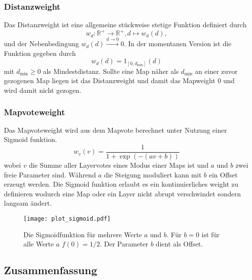    \subsubsection{Distanzweight}
        Das Distanzweight ist eine allgemeine stückweise stetige Funktion definiert durch
        \begin{equation}
            w_d : \mathbb{R}^+ \rightarrow \mathbb{R}^+, d \mapsto w_d(d),
        \end{equation}
        und der Nebenbedingung $w_d(d)\overset{d\rightarrow 0}{\longrightarrow}0$.
        In der momentanen Version ist die Funktion gegeben durch
        \begin{equation}
            w_d(d) = 1_{[0,d_\text{min}]}(d)
        \end{equation}
        mit $d_\text{min}\geq 0$ als Mindestdistanz. 
        Sollte eine Map näher als $d_\text{min}$ an einer zuvor gezogenen Map liegen ist das Distanzweight und damit das Mapweight $0$ und wird damit nicht gezogen. 
    \subsubsection{Mapvoteweight}
        Das Mapvoteweight wird aus dem Mapvote berechnet unter Nutzung einer Sigmoid funktion. 
        \begin{equation}
            w_v(v) = \frac{1}{1+\exp\left(-(av+b)\right)}
        \end{equation}
        wobei $v$ die Summe aller Layervotes eines Modus einer Maps ist und $a$ und $b$ zwei freie Parameter sind.
        Während $a$ die Steigung moduliert kann mit $b$ ein Offset erzeugt werden.
        Die Sigmoid funktion erlaubt es ein kontinuierliches weight zu definieren wodurch eine Map oder ein Layer nicht abrupt verschwindet sondern langsam ändert.
        \begin{figure}[htbp]
            \centering
            \texttt{[image: plot\_sigmoid.pdf]}
            \caption{Die Sigmoidfunktion für mehrere Werte $a$ und $b$. 
                        Für $b=0$ ist für alle Werte $a$ $f(0)=1/2$.
                        Der Parameter $b$ dient als Offset.}
        \end{figure}
    \subsection{Zusammenfassung}
